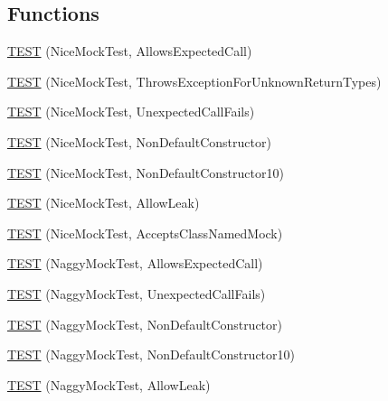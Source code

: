 \subsection*{Functions}
\begin{DoxyCompactItemize}
\item 
\mbox{\hyperlink{namespacetesting_1_1gmock__nice__strict__test_a12b9f686345faa5a646da65a67c38a44}{T\+E\+ST}} (Nice\+Mock\+Test, Allows\+Expected\+Call)
\item 
\mbox{\hyperlink{namespacetesting_1_1gmock__nice__strict__test_af6a34a561886bec5e278239ef65d6011}{T\+E\+ST}} (Nice\+Mock\+Test, Throws\+Exception\+For\+Unknown\+Return\+Types)
\item 
\mbox{\hyperlink{namespacetesting_1_1gmock__nice__strict__test_a2bad58b3a12ea95eb4a731026c576b40}{T\+E\+ST}} (Nice\+Mock\+Test, Unexpected\+Call\+Fails)
\item 
\mbox{\hyperlink{namespacetesting_1_1gmock__nice__strict__test_a4172e1193c21d61e34d9b2c379d2f6be}{T\+E\+ST}} (Nice\+Mock\+Test, Non\+Default\+Constructor)
\item 
\mbox{\hyperlink{namespacetesting_1_1gmock__nice__strict__test_a81bfeea94824935648545225f5dd3c00}{T\+E\+ST}} (Nice\+Mock\+Test, Non\+Default\+Constructor10)
\item 
\mbox{\hyperlink{namespacetesting_1_1gmock__nice__strict__test_a49fd5610815a7ced633a1c8ac3f62709}{T\+E\+ST}} (Nice\+Mock\+Test, Allow\+Leak)
\item 
\mbox{\hyperlink{namespacetesting_1_1gmock__nice__strict__test_a0a43059a52437e547c8fb836008b8e60}{T\+E\+ST}} (Nice\+Mock\+Test, Accepts\+Class\+Named\+Mock)
\item 
\mbox{\hyperlink{namespacetesting_1_1gmock__nice__strict__test_a8ae416186af77fc0d066467be92c6c86}{T\+E\+ST}} (Naggy\+Mock\+Test, Allows\+Expected\+Call)
\item 
\mbox{\hyperlink{namespacetesting_1_1gmock__nice__strict__test_a475ee57b7b86f3f81d50819db3dd78b4}{T\+E\+ST}} (Naggy\+Mock\+Test, Unexpected\+Call\+Fails)
\item 
\mbox{\hyperlink{namespacetesting_1_1gmock__nice__strict__test_a9618de98b38e8e4270873d9b2616e3e1}{T\+E\+ST}} (Naggy\+Mock\+Test, Non\+Default\+Constructor)
\item 
\mbox{\hyperlink{namespacetesting_1_1gmock__nice__strict__test_a982de09f3040cc5b9f457a7aa4e00652}{T\+E\+ST}} (Naggy\+Mock\+Test, Non\+Default\+Constructor10)
\item 
\mbox{\hyperlink{namespacetesting_1_1gmock__nice__strict__test_abafc38649114354a5dc342524ca2102e}{T\+E\+ST}} (Naggy\+Mock\+Test, Allow\+Leak)

\end{DoxyCompactItemize}
